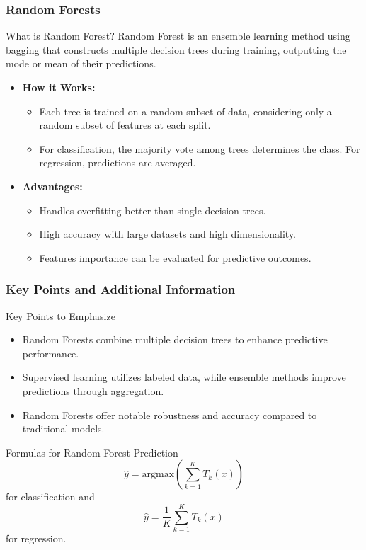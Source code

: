 \documentclass[aspectratio=169]{beamer}
\begin{document}
\begin{frame}[fragile]
    \frametitle{Random Forests}
    \begin{block}{What is Random Forest?}
        Random Forest is an ensemble learning method using bagging that constructs multiple decision trees during training, outputting the mode or mean of their predictions.
    \end{block}
    \begin{itemize}
        \item \textbf{How it Works:}
        \begin{itemize}
            \item Each tree is trained on a random subset of data, considering only a random subset of features at each split.
            \item For classification, the majority vote among trees determines the class. For regression, predictions are averaged.
        \end{itemize}
        \item \textbf{Advantages:}
        \begin{itemize}
            \item Handles overfitting better than single decision trees.
            \item High accuracy with large datasets and high dimensionality.
            \item Features importance can be evaluated for predictive outcomes.
        \end{itemize}
    \end{itemize}
\end{frame}

\begin{frame}[fragile]
    \frametitle{Key Points and Additional Information}
    \begin{block}{Key Points to Emphasize}
        \begin{itemize}
            \item Random Forests combine multiple decision trees to enhance predictive performance.
            \item Supervised learning utilizes labeled data, while ensemble methods improve predictions through aggregation.
            \item Random Forests offer notable robustness and accuracy compared to traditional models.
        \end{itemize}
    \end{block}
    
    \begin{block}{Formulas for Random Forest Prediction}
        \[
        \hat{y} = \text{argmax} \left( \sum_{k=1}^{K} T_k(x) \right)
        \]
        for classification and
        \[
        \hat{y} = \frac{1}{K} \sum_{k=1}^{K} T_k(x)
        \]
        for regression.
    \end{block}
\end{frame}
\end{document}
